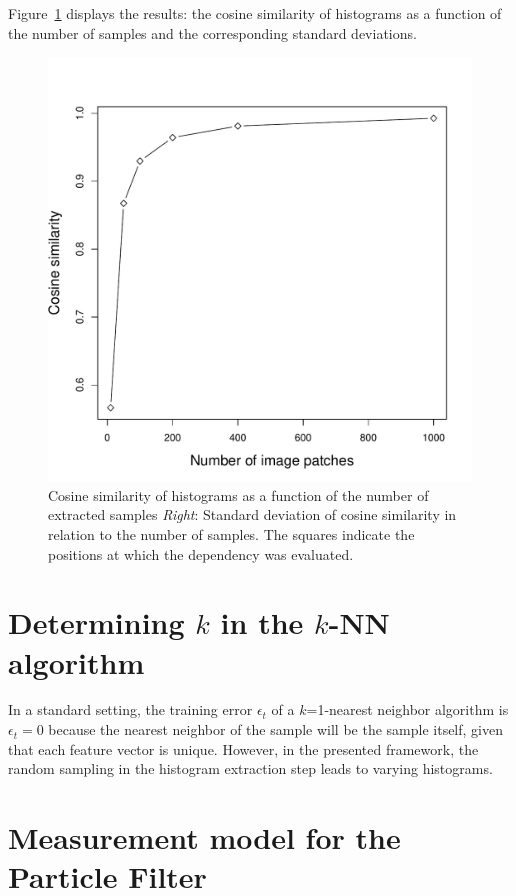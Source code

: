 \documentclass[11pt]{report}
\begin{document}
Figure~\ref{fig:cosine} displays the results: the cosine similarity of
histograms as a function of the number of samples and the
corresponding standard deviations.


\begin{figure}[h!]
\begin{center}
\includegraphics[width=0.7\columnwidth]{samples_vs_similarity}
\caption{{\label{fig:cosine} Cosine similarity of histograms as a
    function of the number of extracted samples \emph{Right}: Standard deviation
    of cosine similarity in relation to the number of samples. The
    squares indicate the positions at which the dependency was
    evaluated.%
  }}
\end{center}
\end{figure}


\section{Determining $k$ in the $k$-NN algorithm}
\label{sec:detk}

In a standard setting, the training error $\epsilon_t$ of a
$k$=1-nearest neighbor algorithm is $\epsilon_t = 0$ because the
nearest neighbor of the sample will be the sample itself, given that
each feature vector is unique. However, in the presented framework,
the random sampling in the histogram extraction step leads to varying
histograms.


\section{Measurement model for the Particle Filter}
\label{sec:measurementmodel}
\end{document}
